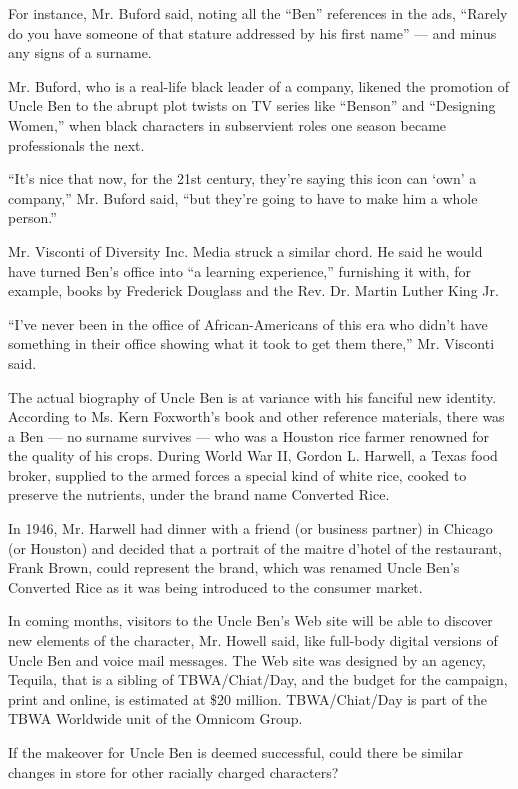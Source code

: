 For instance, Mr. Buford said, noting all the ``Ben'' references in the
ads, ``Rarely do you have someone of that stature addressed by his first
name'' --- and minus any signs of a surname.

Mr. Buford, who is a real-life black leader of a company, likened the
promotion of Uncle Ben to the abrupt plot twists on TV series like
``Benson'' and ``Designing Women,'' when black characters in subservient
roles one season became professionals the next.

``It's nice that now, for the 21st century, they're saying this icon can
`own' a company,'' Mr. Buford said, ``but they're going to have to make
him a whole person.''

Mr. Visconti of Diversity Inc. Media struck a similar chord. He said he
would have turned Ben's office into ``a learning experience,''
furnishing it with, for example, books by Frederick Douglass and the
Rev. Dr. Martin Luther King Jr.

``I've never been in the office of African-Americans of this era who
didn't have something in their office showing what it took to get them
there,'' Mr. Visconti said.

The actual biography of Uncle Ben is at variance with his fanciful new
identity. According to Ms. Kern Foxworth's book and other reference
materials, there was a Ben --- no surname survives --- who was a Houston
rice farmer renowned for the quality of his crops. During World War II,
Gordon L. Harwell, a Texas food broker, supplied to the armed forces a
special kind of white rice, cooked to preserve the nutrients, under the
brand name Converted Rice.

In 1946, Mr. Harwell had dinner with a friend (or business partner) in
Chicago (or Houston) and decided that a portrait of the maitre d'hotel
of the restaurant, Frank Brown, could represent the brand, which was
renamed Uncle Ben's Converted Rice as it was being introduced to the
consumer market.

In coming months, visitors to the Uncle Ben's Web site will be able to
discover new elements of the character, Mr. Howell said, like full-body
digital versions of Uncle Ben and voice mail messages. The Web site was
designed by an agency, Tequila, that is a sibling of TBWA/Chiat/Day, and
the budget for the campaign, print and online, is estimated at \$20
million. TBWA/Chiat/Day is part of the TBWA Worldwide unit of the
Omnicom Group.

If the makeover for Uncle Ben is deemed successful, could there be
similar changes in store for other racially charged characters?

